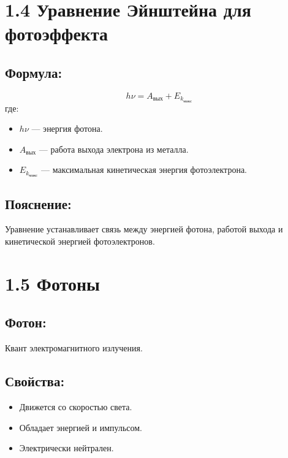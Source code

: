 \documentclass[a4paper,12pt]{article}
\begin{document}
\newpage
\section*{1.4 Уравнение Эйнштейна для фотоэффекта}
\vspace{-9pt}
\subsection*{Формула:}
\vspace{-3pt}

\vspace{-0.05em}
$$ h\nu = A_{\text{вых}} + E_{k_{\text{макс}}} $$
где:
\begin{itemize}[itemsep=0pt, topsep=0pt, parsep=3pt]
    \item $h\nu$ — энергия фотона.
    \item $A_{\text{вых}}$ — работа выхода электрона из металла.
    \item $E_{k_{\text{макс}}}$ — максимальная кинетическая энергия фотоэлектрона.
\end{itemize}

\vspace{-9pt}
\subsection*{Пояснение:}
\vspace{-3pt}
Уравнение устанавливает связь между энергией фотона, работой выхода и кинетической энергией фотоэлектронов.


\section*{1.5 Фотоны}
\vspace{-9pt}
\subsection*{Фотон:}
\vspace{-3pt}
Квант электромагнитного излучения.

\vspace{-9pt}
\subsection*{Свойства:}
\vspace{-3pt}
\begin{itemize}[itemsep=0pt, topsep=0pt, parsep=3pt]
    \item Движется со скоростью света.
    \item Обладает энергией и импульсом.
    \item Электрически нейтрален.
\end{itemize}
\end{document}
